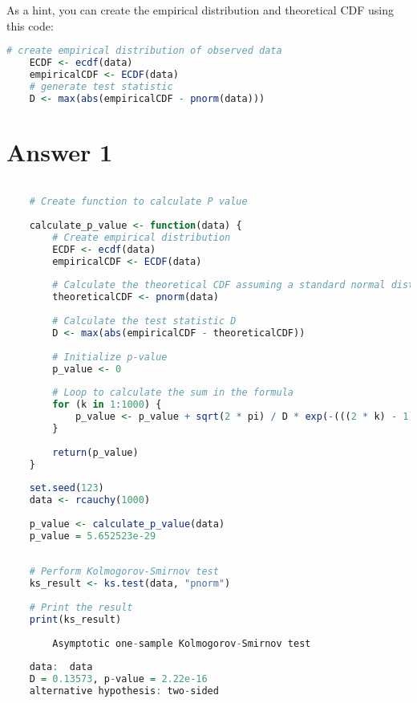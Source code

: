 \documentclass[12pt,letterpaper]{article}
\begin{document}
	
\noindent As a hint, you can create the empirical distribution and theoretical CDF using this code:

\begin{lstlisting}[language=R]
	# create empirical distribution of observed data
	ECDF <- ecdf(data)
	empiricalCDF <- ECDF(data)
	# generate test statistic
	D <- max(abs(empiricalCDF - pnorm(data))) \end{lstlisting}


	\vspace{.25cm}
	
	\newpage
	
\section*{Answer 1} 
\vspace{.25cm}

\begin{lstlisting}[language=R]

	# Create function to calculate P value
	
	calculate_p_value <- function(data) {
		# Create empirical distribution
		ECDF <- ecdf(data)
		empiricalCDF <- ECDF(data)
		
		# Calculate the theoretical CDF assuming a standard normal distribution
		theoreticalCDF <- pnorm(data)
		
		# Calculate the test statistic D
		D <- max(abs(empiricalCDF - theoreticalCDF))
		
		# Initialize p-value
		p_value <- 0
		
		# Loop to calculate the sum in the formula
		for (k in 1:1000) {  
			p_value <- p_value + sqrt(2 * pi) / D * exp(-(((2 * k) - 1)^2) * pi^2 / (8 * D^2))
		}
		
		return(p_value)
	}
	
	set.seed(123)
	data <- rcauchy(1000)
	
	p_value <- calculate_p_value(data)
	p_value = 5.652523e-29
	
	
	# Perform Kolmogorov-Smirnov test
	ks_result <- ks.test(data, "pnorm")
	
	# Print the result
	print(ks_result)
	
		Asymptotic one-sample Kolmogorov-Smirnov test
	
	data:  data
	D = 0.13573, p-value = 2.22e-16
	alternative hypothesis: two-sided
	
	
	 \end{lstlisting}

\vspace{3in}
\end{document}
